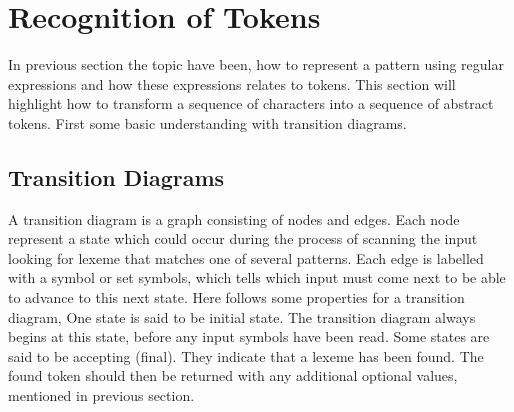 \section{Recognition of Tokens}
In previous section the topic have been, how to represent a pattern using 
regular expressions and how these expressions relates to tokens. This section 
will highlight how to transform a sequence of characters into a sequence of 
abstract tokens. First some basic understanding with transition diagrams.  
\subsection{Transition Diagrams}
A transition diagram is a graph consisting of nodes and edges. Each node 
represent a state which could occur during the process of scanning the input 
looking for lexeme that matches one of several patterns. Each edge is labelled 
with a symbol or set symbols, which tells which input must come next to be able 
to advance to this next state. Here follows some properties for a transition 
diagram, One state is said to be initial state. The transition diagram always 
begins at this state, before any input symbols have been read. Some states are 
said to be accepting (final). They indicate that a lexeme has been found. The 
found token should then be returned with any additional optional values, 
mentioned in previous section. \cite{Aho2006}
